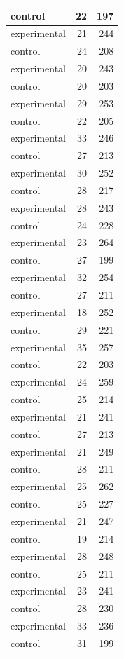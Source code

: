 \documentclass[]{svmono}
\begin{document}
\begin{tabular}{l|r|r}
\hline
control & 22 & 197\\
\hline
experimental & 21 & 244\\
\hline
control & 24 & 208\\
\hline
experimental & 20 & 243\\
\hline
control & 20 & 203\\
\hline
experimental & 29 & 253\\
\hline
control & 22 & 205\\
\hline
experimental & 33 & 246\\
\hline
control & 27 & 213\\
\hline
experimental & 30 & 252\\
\hline
control & 28 & 217\\
\hline
experimental & 28 & 243\\
\hline
control & 24 & 228\\
\hline
experimental & 23 & 264\\
\hline
control & 27 & 199\\
\hline
experimental & 32 & 254\\
\hline
control & 27 & 211\\
\hline
experimental & 18 & 252\\
\hline
control & 29 & 221\\
\hline
experimental & 35 & 257\\
\hline
control & 22 & 203\\
\hline
experimental & 24 & 259\\
\hline
control & 25 & 214\\
\hline
experimental & 21 & 241\\
\hline
control & 27 & 213\\
\hline
experimental & 21 & 249\\
\hline
control & 28 & 211\\
\hline
experimental & 25 & 262\\
\hline
control & 25 & 227\\
\hline
experimental & 21 & 247\\
\hline
control & 19 & 214\\
\hline
experimental & 28 & 248\\
\hline
control & 25 & 211\\
\hline
experimental & 23 & 241\\
\hline
control & 28 & 230\\
\hline
experimental & 33 & 236\\
\hline
control & 31 & 199\\

\end{tabular}
\end{document}
